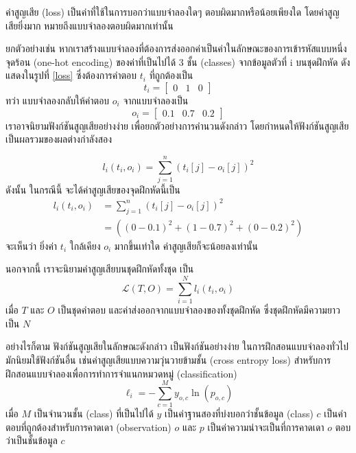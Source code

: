 ค่าสูญเสีย (loss) เป็นค่าที่ใช้ในการบอกว่าแบบจำลองใดๆ ตอบผิดมากหรือน้อยเพียงใด โดยค่าสูญเสียยิ่งมาก หมายถึงแบบจำลองตอบผิดมากเท่านั้น

ยกตัวอย่างเช่น หากเราสร้างแบบจำลองที่ต้องการส่งออกค่าเป็นค่าในลักษณะของการเข้ารหัสแบบหนึ่งจุดร้อน (one-hot encoding) ของค่าที่เป็นไปได้ 3 ชั้น (classes) จากข้อมูลตัวที่ i บนชุดฝึกหัด ดังแสดงในรูปที่ \ref{loss} ซึ่งต้องการคำตอบ $t_i$ ที่ถูกต้องเป็น
$$t_i = 
\begin{bmatrix}
    0 & 1 & 0
\end{bmatrix}
$$
ทว่า แบบจำลองกลับให้คำตอบ $o_i$ จากแบบจำลองเป็น
$$o_i = 
\begin{bmatrix}
    0.1 & 0.7 & 0.2
\end{bmatrix}
$$
เราอาจนิยามฟังก์ชันสูญเสียอย่างง่าย เพื่อยกตัวอย่างการคำนวนดังกล่าว โดยกำหนดให้ฟังก์ชันสูญเสียเป็นผลรวมของผลต่างกำลังสอง

$$
l_i\left(t_i, o_i\right) = \sum_{j=1}^{n}{\left(t_i[j] - o_i[j]\right)^2}
$$
ดังนั้น ในกรณีนี้ จะได้ค่าสูญเสียของจุดฝึกหัดนี้เป็น
\begin{align*}
    l_i\left(t_i, o_i\right) &= \sum_{j=1}^{n}{\left(t_i[j] - o_i[j]\right)^2}\\
    &= \left((0-0.1)^2 + (1-0.7)^2 + (0-0.2)^2\right)
\end{align*}
จะเห็นว่า ยิ่งค่า $t_i$ ใกล้เคียง $o_i$ มากขึ้นเท่าใด ค่าสูญเสียก็จะน้อยลงเท่านั้น

นอกจากนี้ เราจะนิยามค่าสูญเสียบนชุดฝึกหัดทั้งชุด เป็น
\begin{equation}
\mathscr{L}(T, O) = \sum_{i=1}^{N} l_i(t_i, o_i)
\end{equation}
เมื่อ $T$ และ $O$ เป็นชุดคำตอบ และค่าส่งออกจากแบบจำลองของทั้งชุดฝึกหัด ซึ่งชุดฝึกหัดมีความยาวเป็น $N$

อย่างไรก็ตาม ฟังก์ชันสูญเสียในลักษณะดังกล่าว เป็นฟังก์ชันอย่างง่าย ในการฝึกสอนแบบจำลองทั่วไปมักนิยมใช้ฟังก์ชันอื่น เช่นค่าสูญเสียแบบความวุ่นวายข้ามชั้น (cross entropy loss) สำหรับการฝึกสอนแบบจำลองเพื่อการทำการจำแนกหมวดหมู่ (classification)
$$
    \ell_i = -\sum_{c=1}^{M}y_{o,c}\ln(p_{o,c})
    \label{cross-entropy-loss}
$$
เมื่อ $M$ เป็นจำนวนชั้น (class) ที่เป็นไปได้ $y$ เป็นค่าฐานสองที่บ่งบอกว่าชั้นข้อมูล (class) $c$ เป็นคำตอบที่ถูกต้องสำหรับการคาดเดา (observation) $o$ และ $p$ เป็นค่าความน่าจะเป็นที่การคาดเดา $o$ ตอบว่าเป็นชั้นข้อมูล $c$

